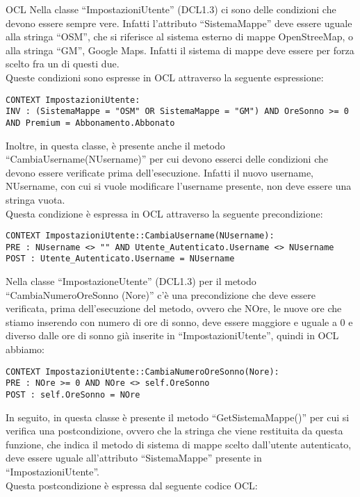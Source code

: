 \begin{listaPersonale}{OCL}
    Nella classe “ImpostazioniUtente” (DCL1.3) ci sono delle condizioni che devono essere sempre vere. Infatti l'attributo “SistemaMappe” deve essere uguale alla stringa “OSM”, che si riferisce al sistema esterno di mappe OpenStreeMap, o alla stringa “GM”, Google Maps. Infatti il sistema di mappe deve essere per forza scelto fra un di questi due. \\
    Queste condizioni sono espresse in OCL attraverso la seguente espressione:
    \begin{lstlisting}
CONTEXT ImpostazioniUtente:
INV : (SistemaMappe = "OSM" OR SistemaMappe = "GM") AND OreSonno >= 0 AND Premium = Abbonamento.Abbonato
    \end{lstlisting}
    Inoltre, in questa classe, è presente anche il metodo “CambiaUsername(NUsername)” per cui devono esserci delle condizioni che devono essere verificate prima dell'esecuzione. Infatti il nuovo username, NUsername, con cui si vuole modificare l'username presente, non deve essere una stringa vuota. \\
    Questa condizione è espressa in OCL attraverso la seguente precondizione:
    \begin{lstlisting}
CONTEXT ImpostazioniUtente::CambiaUsername(NUsername):
PRE : NUsername <> "" AND Utente_Autenticato.Username <> NUsername
POST : Utente_Autenticato.Username = NUsername
    \end{lstlisting}
    Nella classe “ImpostazioneUtente” (DCL1.3) per il metodo “CambiaNumeroOreSonno (Nore)” c'è una precondizione che deve essere verificata, prima dell'esecuzione del metodo, ovvero che NOre, le nuove ore che stiamo inserendo con numero di ore di sonno, deve essere maggiore e uguale a 0 e diverso dalle ore di sonno già inserite in “ImpostazioniUtente”, quindi in OCL abbiamo:
    \begin{lstlisting} 
CONTEXT ImpostazioniUtente::CambiaNumeroOreSonno(Nore):
PRE : NOre >= 0 AND NOre <> self.OreSonno
POST : self.OreSonno = NOre
    \end{lstlisting}
    In seguito, in questa classe è presente il metodo “GetSistemaMappe()” per cui si verifica una postcondizione, ovvero che la stringa che viene restituita da questa funzione, che indica il metodo di sistema di mappe scelto dall'utente autenticato, deve essere uguale all'attributo “SistemaMappe” presente in “ImpostazioniUtente”. \\ Questa postcondizione è espressa dal seguente codice OCL:
    \begin{lstlisting}

\end{lstlisting}
\end{listaPersonale}
